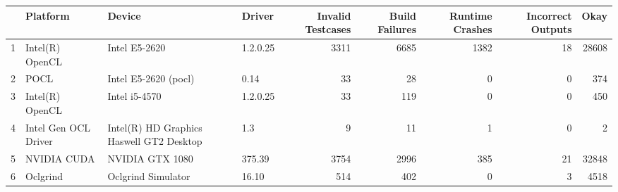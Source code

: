 \begin{tabular}{llllrrrrr}
\toprule
{} &              Platform &                                    Device &    Driver &  Invalid Testcases &  Build Failures &  Runtime Crashes &  Incorrect Outputs &   Okay \\
\midrule
1 &       Intel(R) OpenCL &                             Intel E5-2620 &  1.2.0.25 &               3311 &            6685 &             1382 &                 18 &  28608 \\
2 &                  POCL &                      Intel E5-2620 (pocl) &      0.14 &                 33 &              28 &                0 &                  0 &    374 \\
3 &       Intel(R) OpenCL &                             Intel i5-4570 &  1.2.0.25 &                 33 &             119 &                0 &                  0 &    450 \\
4 &  Intel Gen OCL Driver &  Intel(R) HD Graphics Haswell GT2 Desktop &       1.3 &                  9 &              11 &                1 &                  0 &      2 \\
5 &           NVIDIA CUDA &                           NVIDIA GTX 1080 &    375.39 &               3754 &            2996 &              385 &                 21 &  32848 \\
6 &              Oclgrind &                        Oclgrind Simulator &     16.10 &                514 &             402 &                0 &                  3 &   4518 \\
\bottomrule
\end{tabular}

